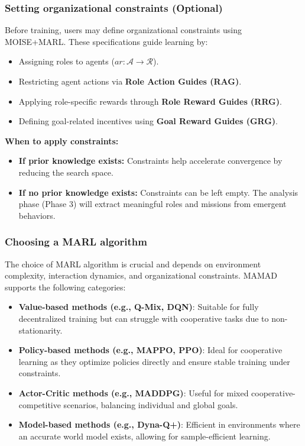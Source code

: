 \documentclass[pdflatex,sn-mathphys-num]{sn-jnl}%
\theoremstyle{thmstyleone}%
\theoremstyle{thmstyletwo}%
\theoremstyle{thmstylethree}%
\begin{document}
\subsubsection{Setting organizational constraints (Optional)}
Before training, users may define organizational constraints using MOISE+MARL. These specifications guide learning by:
\begin{itemize}
    \item Assigning roles to agents ($ar: \mathcal{A} \to \mathcal{R}$).
    \item Restricting agent actions via \textbf{Role Action Guides (RAG)}.
    \item Applying role-specific rewards through \textbf{Role Reward Guides (RRG)}.
    \item Defining goal-related incentives using \textbf{Goal Reward Guides (GRG)}.
\end{itemize}

\noindent \textbf{When to apply constraints:}
\begin{itemize}
    \item \textbf{If prior knowledge exists:} Constraints help accelerate convergence by reducing the search space.
    \item \textbf{If no prior knowledge exists:} Constraints can be left empty. The analysis phase (Phase 3) will extract meaningful roles and missions from emergent behaviors.
\end{itemize}

\subsubsection{Choosing a MARL algorithm}
The choice of MARL algorithm is crucial and depends on environment complexity, interaction dynamics, and organizational constraints. MAMAD supports the following categories:

\begin{itemize}
    \item \textbf{Value-based methods (e.g., Q-Mix, DQN)}: Suitable for fully decentralized training but can struggle with cooperative tasks due to non-stationarity.
    \item \textbf{Policy-based methods (e.g., MAPPO, PPO)}: Ideal for cooperative learning as they optimize policies directly and ensure stable training under constraints.
    \item \textbf{Actor-Critic methods (e.g., MADDPG)}: Useful for mixed cooperative-competitive scenarios, balancing individual and global goals.
    \item \textbf{Model-based methods (e.g., Dyna-Q+)}: Efficient in environments where an accurate world model exists, allowing for sample-efficient learning.
\end{itemize}
\end{document}
